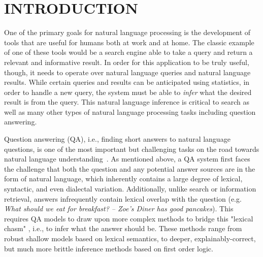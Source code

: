 \chapter{INTRODUCTION\label{chapter:introduction}}

 One of the primary goals for natural language processing is the development of tools that are useful for humans both at work and at home.  The classic example of one of these tools would be a search engine able to take a query and return a relevant and informative result.  In order for this application to be truly useful, though, it needs to operate over natural language queries and natural language results.  While certain queries and results can be anticipated using statistics, in order to handle a new query, the system must be able to \emph{infer} what the desired result is from the query.  This natural language inference is critical to search as well as many other types of natural language processing tasks including question answering.  

Question answering (QA), i.e., finding short answers to natural language questions, is one of the most important but challenging 
tasks on the road towards natural language understanding~\cite{Etzioni:11}. 
As mentioned above, a QA system first faces the challenge that both the question and any potential answer sources are in the form of natural language, which inherently contains a large degree of lexical, syntactic, and even dialectal variation.
Additionally, unlike search or information retrieval, answers infrequently contain lexical overlap with the question (e.g. {\em What should we eat for breakfast? -- Zoe's Diner has good pancakes}).  This requires QA models to draw upon more complex methods to bridge this "lexical chasm" \cite{Berger:00}, i.e., to infer what the answer should be.  These methods range from robust shallow models based on lexical semantics, to deeper, explainably-correct, but much more brittle inference methods based on first order logic.  


